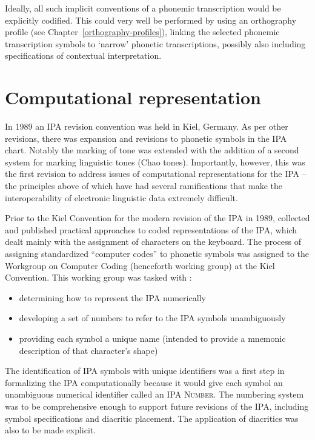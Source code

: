 Ideally, all such implicit conventions of a phonemic transcription would be
explicitly codified. This could very well be performed by using an orthography
profile (see Chapter~\ref{orthography-profiles}), linking the selected phonemic 
transcription symbols to `narrow' phonetic transcriptions, possibly also including 
specifications of contextual interpretation.

\section{Computational representation}

In 1989 an IPA revision convention was held in Kiel, Germany. As per other
revisions, there was expansion and revisions to phonetic symbols in the IPA
chart. Notably the marking of tone was extended with the addition of a second
system for marking linguistic tones (Chao tones). Importantly, however, this was
the first revision to address issues of computational representations for the
IPA -- the principles above of which have had several ramifications that make
the interoperability of electronic linguistic data extremely difficult.

Prior to the Kiel Convention for the modern revision of the IPA in 1989, 
\cite{Wells1987} collected and published practical approaches to coded 
representations of the IPA, which dealt mainly with the assignment of 
characters on the keyboard. The process of assigning standardized ``computer 
codes'' to phonetic symbols was assigned to the Workgroup on Computer 
Coding (henceforth working group) at the Kiel Convention. This working 
group was tasked with \citep{Esling1990,EslingGaylord1993}: 

\begin{itemize}
	\item determining how to represent the IPA numerically
	\item developing a set of numbers to refer to the IPA symbols unambiguously
	\item providing each symbol a unique name (intended to provide a mnemonic description of that character's shape)
\end{itemize}

\noindent The identification of IPA symbols with unique identifiers was 
a first step in formalizing the IPA computationally because it would give 
each symbol an unambiguous numerical identifier called an \textsc{IPA Number}. 
The numbering system was to be comprehensive enough to support future revisions 
of the IPA, including symbol specifications and diacritic placement. The 
application of diacritics was also to be made explicit. 

